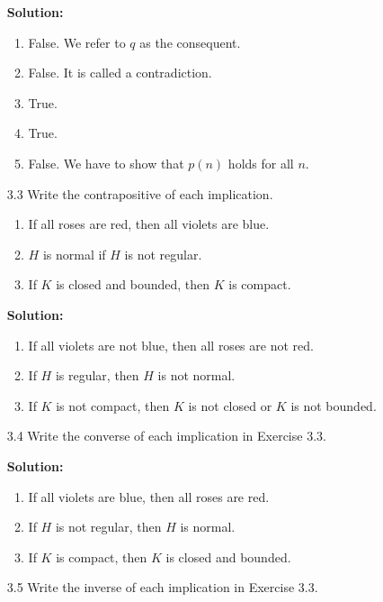\begin{enumerate}
      \textbf{Solution:} 

      \begin{enumerate}
         \item False. We refer to $q$ as the consequent.
         \item False. It is called a contradiction.
         \item True.
         \item True.
         \item False. We have to show that $p(n)$ holds for all $n$.
      \end{enumerate}
   \item[3.3] Write the contrapositive of each implication.
      \begin{enumerate}
         \item If all roses are red, then all violets are blue.
         \item $H$ is normal if $H$ is not regular.
         \item If $K$ is closed and bounded, then $K$ is compact.
      \end{enumerate}

      \textbf{Solution:} 

      \begin{enumerate}
         \item If all violets are not blue, then all roses are not red.
         \item If $H$ is regular, then $H$ is not normal.
         \item If $K$ is not compact, then $K$ is not closed or $K$ is not 
               bounded.
      \end{enumerate}
   \item[3.4] Write the converse of each implication in Exercise 3.3.

      \textbf{Solution:} 

      \begin{enumerate}
         \item If all violets are blue, then all roses are red.
         \item If $H$ is not regular, then $H$ is normal.
         \item If $K$ is compact, then $K$ is closed and bounded.
      \end{enumerate}
   \item[3.5] Write the inverse of each implication in Exercise 3.3.


\end{enumerate}
